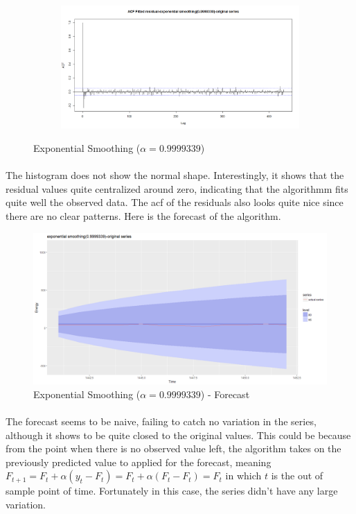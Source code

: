 \documentclass[12pt]{article}
\begin{document}
\begin{figure}[H]
\begin{subfigure}[b]{0.6\linewidth}
  \end{subfigure}
  \begin{subfigure}[b]{0.6\linewidth}
    \includegraphics[width=\linewidth]{figure19-4.png}
  \end{subfigure}
  \caption{Exponential Smoothing ($\alpha=0.9999339$)}
  \label{fig:figure19}
\end{figure}

\paragraph{}
The histogram does not show the normal shape. Interestingly, it shows that the residual values quite centralized around zero, indicating that the algorithmm fits quite well the observed data. The acf of the residuals also looks quite nice since there are no clear patterns. Here is the forecast of the algorithm.
\begin{figure}[H]
  \centering
  \includegraphics[width=\linewidth]{figure19-5.png}
  \caption{Exponential Smoothing ($\alpha=0.9999339$) - Forecast}
  \label{fig:figure20}
\end{figure}

\paragraph{}
The forecast seems to be naive, failing to catch no variation in the series, although it shows to be quite closed to the original values. This could be because from the point when there is no observed value left, the algorithm takes on the previously predicted value to applied for the forecast, meaning $F_{t+1}=F_t+\alpha(y_t-F_t)=F_t +\alpha(F_t-F_t)=F_t$ in which $t$ is the out of sample point of time. Fortunately in this case, the series didn't have any large variation.
\end{document}
